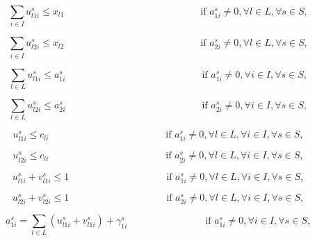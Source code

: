 \begin{equation}
    \sum_{i\in I}u_{l1i}^s \leq x_{l1} \qquad \qquad \qquad \qquad \qquad \qquad \qquad \textrm{if } a_{1i}^s \neq 0, \forall l \in L, \forall s \in S,
    \label{eq4}
\end{equation}

\begin{equation}
    \sum_{i\in I}u_{l2i}^s \leq x_{l2} \qquad \qquad \qquad \qquad \qquad \qquad \qquad \textrm{if } a_{2i}^s \neq 0, \forall l \in L, \forall s \in S,
    \label{eq5}
\end{equation}


\begin{equation}
    \sum_{l\in L}u_{l1i}^s \leq a_{1i}^s \qquad \qquad \qquad \qquad \qquad \qquad \qquad \textrm{if } a_{1i}^s \neq 0, \forall i \in I, \forall s \in S,
    \label{eq6}
\end{equation}

\begin{equation}
    \sum_{l\in L}u_{l2i}^s \leq a_{2i}^s \qquad \qquad \qquad \qquad \qquad \qquad \qquad \textrm{if } a_{2i}^s \neq 0, \forall i \in I, \forall s \in S,
    \label{eq7}
\end{equation}

\begin{equation}
    u_{l1i}^s \leq c_{li} \qquad \qquad \qquad \qquad \qquad \qquad \textrm{if } a_{1i}^s \neq 0, \forall l \in L,  \forall i \in I, \forall s \in S,
    \label{eq8}
\end{equation}


\begin{equation}
    u_{l2i}^s \leq c_{li} \qquad \qquad \qquad \qquad \qquad \qquad \textrm{if } a_{2i}^s \neq 0, \forall l \in L,  \forall i \in I, \forall s \in S,
    \label{eq9}
\end{equation}


\begin{equation}
    u_{l1i}^s + v_{l1i}^s \leq 1 \qquad \qquad \qquad \qquad \qquad  \textrm{if } a_{1i}^s \neq 0, \forall l \in L,  \forall i \in I, \forall s \in S,
    \label{eq10}
\end{equation}


\begin{equation}
    u_{l2i}^s + v_{l2i}^s \leq 1 \qquad \qquad \qquad \qquad \qquad  \textrm{if } a_{2i}^s \neq 0, \forall l \in L,  \forall i \in I, \forall s \in S,
    \label{eq11}
\end{equation}

\begin{equation}
    a_{1i}^s = \sum_{l \in L} (u_{l1i}^s + v_{l1i}^s) + \gamma_{1i}^s \qquad \qquad \qquad \qquad \textrm{if } a_{1i}^s \neq 0,  \forall i \in I, \forall s \in S,
    \label{eq12}
\end{equation}


